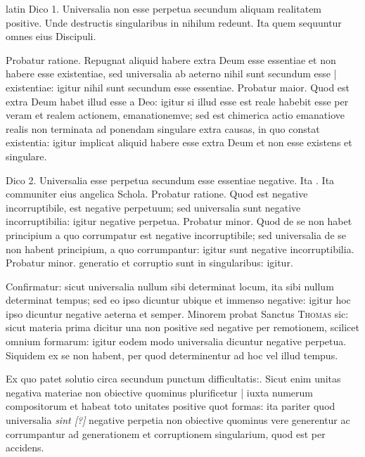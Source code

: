 \begin{otherlanguage*}{latin}
\pstart
 Dico 1. Universalia non esse perpetua secundum aliquam realitatem positive. Unde destructis singularibus in nihilum redeunt. Ita  quem sequuntur omnes eius Discipuli. 
\pend

\pstart
 Probatur ratione. Repugnat aliquid habere extra Deum esse essentiae et non habere esse existentiae, sed universalia ab aeterno nihil sunt secundum esse \textnormal{|} existentiae: igitur nihil sunt secundum esse essentiae. Probatur maior. Quod est extra Deum habet illud esse a Deo: igitur si illud esse est reale habebit esse per veram et realem actionem, emanationemve; sed est chimerica actio emanatiove realis non terminata ad ponendam singulare extra causas, in quo constat existentia: igitur implicat aliquid habere esse extra Deum et non esse existens et singulare. 
\pend

\pstart
 Dico 2. Universalia esse perpetua secundum esse essentiae negative. Ita . Ita communiter eius angelica Schola. Probatur ratione. Quod est negative incorruptibile, est negative perpetuum; sed universalia sunt negative incorruptibilia: igitur negative perpetua. Probatur minor. Quod de se non habet principium a quo corrumpatur est negative incorruptibile; sed universalia de se non habent principium, a quo corrumpantur: igitur sunt negative incorruptibilia. Probatur minor. generatio et corruptio sunt in singularibus: igitur. 
\pend

\pstart
 Confirmatur: sicut universalia nullum sibi determinat locum, ita sibi nullum determinat tempus; sed eo ipso dicuntur ubique et immenso negative: igitur hoc ipso dicuntur negative aeterna et semper. Minorem probat Sanctus \textsc{Thomas} sic: sicut materia prima dicitur una non positive sed negative per remotionem, scilicet omnium formarum: igitur eodem modo universalia dicuntur negative perpetua. Siquidem ex se non habent, per quod determinentur ad hoc vel illud tempus. 
\pend

\pstart
 Ex quo patet solutio circa secundum punctum difficultatis:. Sicut enim unitas negativa materiae non obiective quominus plurificetur \textnormal{|}   iuxta numerum compositorum et habeat toto unitates positive quot formas: ita pariter quod universalia \emph{sint [?]} negative perpetia non obiective quominus vere generentur ac corrumpantur ad generationem et corruptionem singularium, quod est per accidens. 
\pend


\end{otherlanguage*}
